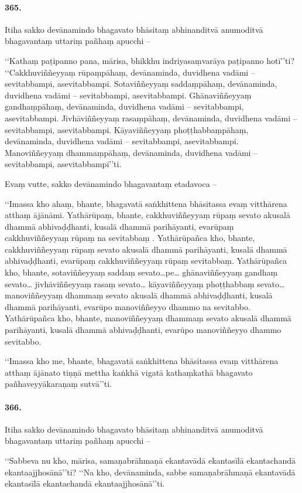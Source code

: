 \paragraph{365.} Itiha sakko devānamindo bhagavato bhāsitaṃ abhinanditvā anumoditvā bhagavantaṃ uttariṃ pañhaṃ apucchi –

‘‘Kathaṃ paṭipanno pana, mārisa, bhikkhu indriyasaṃvarāya paṭipanno hotī’’ti? ‘‘Cakkhuviññeyyaṃ rūpaṃpāhaṃ, devānaminda, duvidhena vadāmi – sevitabbampi, asevitabbampi. Sotaviññeyyaṃ saddaṃpāhaṃ, devānaminda, duvidhena vadāmi – sevitabbampi, asevitabbampi. Ghānaviññeyyaṃ gandhaṃpāhaṃ, devānaminda, duvidhena vadāmi – sevitabbampi, asevitabbampi. Jivhāviññeyyaṃ rasaṃpāhaṃ, devānaminda, duvidhena vadāmi – sevitabbampi, asevitabbampi. Kāyaviññeyyaṃ phoṭṭhabbaṃpāhaṃ, devānaminda, duvidhena vadāmi – sevitabbampi, asevitabbampi. Manoviññeyyaṃ dhammaṃpāhaṃ, devānaminda, duvidhena vadāmi – sevitabbampi, asevitabbampī’’ti.

Evaṃ vutte, sakko devānamindo bhagavantaṃ etadavoca –

‘‘Imassa kho ahaṃ, bhante, bhagavatā saṅkhittena bhāsitassa evaṃ vitthārena atthaṃ ājānāmi. Yathārūpaṃ, bhante, cakkhuviññeyyaṃ rūpaṃ sevato akusalā dhammā abhivaḍḍhanti, kusalā dhammā parihāyanti, evarūpaṃ cakkhuviññeyyaṃ rūpaṃ na sevitabbaṃ . Yathārūpañca kho, bhante, cakkhuviññeyyaṃ rūpaṃ sevato akusalā dhammā parihāyanti, kusalā dhammā abhivaḍḍhanti, evarūpaṃ cakkhuviññeyyaṃ rūpaṃ sevitabbaṃ. Yathārūpañca kho, bhante, sotaviññeyyaṃ saddaṃ sevato…pe… ghānaviññeyyaṃ gandhaṃ sevato… jivhāviññeyyaṃ rasaṃ sevato… kāyaviññeyyaṃ phoṭṭhabbaṃ sevato… manoviññeyyaṃ dhammaṃ sevato akusalā dhammā abhivaḍḍhanti, kusalā dhammā parihāyanti, evarūpo manoviññeyyo dhammo na sevitabbo. Yathārūpañca kho, bhante, manoviññeyyaṃ dhammaṃ sevato akusalā dhammā parihāyanti, kusalā dhammā abhivaḍḍhanti, evarūpo manoviññeyyo dhammo sevitabbo.

‘‘Imassa kho me, bhante, bhagavatā saṅkhittena bhāsitassa evaṃ vitthārena atthaṃ ājānato tiṇṇā mettha kaṅkhā vigatā kathaṃkathā bhagavato pañhaveyyākaraṇaṃ sutvā’’ti.

\paragraph{366.} Itiha sakko devānamindo bhagavato bhāsitaṃ abhinanditvā anumoditvā bhagavantaṃ uttariṃ pañhaṃ apucchi –

‘‘Sabbeva nu kho, mārisa, samaṇabrāhmaṇā ekantavādā ekantasīlā ekantachandā ekantaajjhosānā’’ti? ‘‘Na kho, devānaminda, sabbe samaṇabrāhmaṇā ekantavādā ekantasīlā ekantachandā ekantaajjhosānā’’ti.


